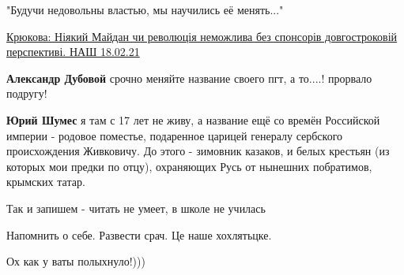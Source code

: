 \begin{itemize}
"Будучи недовольны властью, мы научились её менять..."

\href{https://youtu.be/y2C1mQ7Rbno}{%
Крюкова: Ніякий Майдан чи революція неможлива без спонсорів довгостроковій перспективі. НАШ 18.02.21%
}

\begin{itemize}
 
\textbf{Александр Дубовой} срочно меняйте название своего пгт, а то....! прорвало подругу!

 
\textbf{Юрий Шумес} я там с 17 лет не живу, а название ещё со времён Российской империи - родовое поместье, подаренное царицей генералу сербского происхождения Живковичу. До этого - зимовник казаков, и белых крестьян (из которых мои предки по отцу), охраняющих Русь от нынешних побратимов, крымских татар.
\end{itemize}

 
Так и запишем - читать не умеет, в школе не училась

 
Напомнить о себе. Развести срач. Це наше хохлятьцке.

 
Ох как у ваты полыхнуло!)))

 

\end{itemize}
